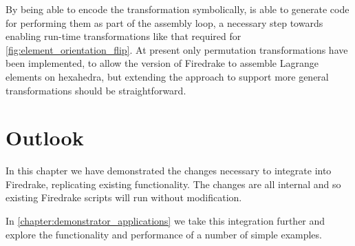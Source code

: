 \documentclass[thesis]{subfiles}
\begin{document}
By being able to encode the transformation symbolically,  is able to generate code for performing them as part of the assembly loop, a necessary step towards enabling run-time transformations like that required for \cref{fig:element_orientation_flip}.
At present only permutation transformations have been implemented, to allow the  version of Firedrake to assemble Lagrange elements on hexahedra, but extending the approach to support more general transformations should be straightforward.

\section{Outlook}

In this chapter we have demonstrated the changes necessary to integrate  into Firedrake, replicating existing  functionality.
The changes are all internal and so existing Firedrake scripts will run without modification.

In \cref{chapter:demonstrator_applications} we take this integration further and explore the functionality and performance of a number of simple examples.
\end{document}
